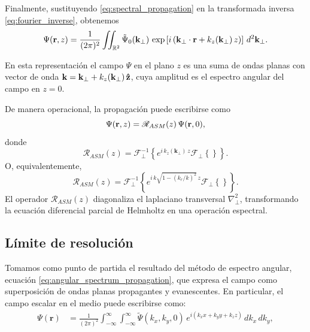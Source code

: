 Finalmente, sustituyendo \eqref{eq:spectral_propagation} en la transformada inversa \eqref{eq:fourier_inverse}, obtenemos
\begin{equation}
\Psi(\vb r,z)
=
\frac{1}{(2\pi)^2}
\iint_{\mathbb R^2}
\tilde{\Psi}_0(\mathbf k_\perp)\,
\exp
\left[
i\left(
\mathbf k_\perp\cdot\vb r
+
k_z(\mathbf k_\perp)\,z
\right)
\right]
\,d^2\mathbf k_\perp.
\label{eq:angular_spectrum_propagation}
\end{equation}

En esta representación el campo $\Psi$ en el plano $z$ es una suma de ondas planas con vector de onda $\vb k = \vb k_\perp + k_z(\vb k_\perp)\,\bm{\hat{\mathbf{z}}}$, cuya amplitud es el espectro angular del campo en $z=0$.

De manera operacional, la propagación puede escribirse como
\begin{equation}
\Psi(\vb r,z)
=
\mathscr R_{ASM}(z)\,
\Psi(\vb r,0),
\label{eq:operator_form}
\end{equation}
donde
\begin{equation}
\mathscr R_{ASM}(z)
=
\mathscr F_\perp^{-1}
\left\{
e^{i\,k_z(\mathbf k_\perp)\,z}
\mathscr F_\perp \left\{ \right\} \right\}.
\label{eq:propagation_operator}
\end{equation}
O, equivalentemente,
\begin{equation}
\mathscr R_{ASM}(z)
=
\mathscr F_\perp^{-1}
\left\{
  e^{i\, k \sqrt{1 - (k_r/k)^2 }  \,z}
\mathscr F_\perp \left\{ \right\} \right\}.
\label{eq:propagation_operator_explicit}
\end{equation}
El operador $\mathscr R_{ASM}(z)$ diagonaliza el laplaciano transversal $\nabla_\perp^2$, transformando la ecuación diferencial parcial de Helmholtz en una operación espectral.








\subsection{Límite de resolución} 
\label{sec:resolution_limit}

Tomamos como punto de partida el resultado del método de espectro angular, ecuación \eqref{eq:angular_spectrum_propagation}, que expresa el campo como superposición de ondas planas propagantes y evanescentes. En particular, el campo escalar en el medio puede escribirse como:
\begin{equation}
\begin{aligned}
\Psi(\mathbf r)
&= \frac{1}{(2\pi)^2}
\int_{-\infty}^{\infty}\!\!\int_{-\infty}^{\infty}
\tilde\Psi(k_x,k_y,0)\,
e^{i(k_x x + k_y y + k_z z)}\, dk_x\,dk_y,
\end{aligned}
\end{equation}

